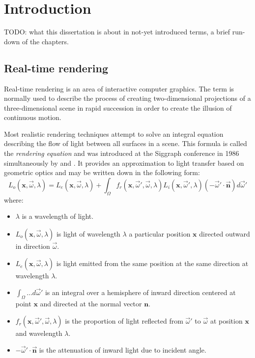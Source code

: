 
\chapter{ Introduction }
\label{Chapter1}

TODO: what this dissertation is about in not-yet introduced terms, a brief run-down of the chapters.

\section{Real-time rendering}

Real-time rendering is an area of interactive computer graphics. The term is normally used to describe the process of creating two-dimensional projections of a three-dimensional scene in rapid succession in order to create the illusion of continuous motion.

Most realistic rendering techniques attempt to solve an integral equation describing the flow of light between all surfaces in a scene. This formula is called the \emph{rendering equation} and was introduced at the Siggraph conference in 1986 simultaneously by \citet{Kajiya86RenderingEq} and \citet{Immel86}. It provides an approximation to light transfer based on geometric optics and may be written down in the following form:
\[
L_o(\mathbf x, \overrightarrow{\omega}, \lambda) = L_e(\mathbf x, \overrightarrow{\omega}, \lambda) + \int_\Omega f_r(\mathbf x, \overrightarrow{\omega}', \overrightarrow{\omega}, \lambda) L_i(\mathbf x, \overrightarrow{\omega}', \lambda) (-\overrightarrow{\omega}' \cdot \overrightarrow{\mathbf n}) d \overrightarrow{\omega}'
\]
where:
\begin{itemize}
\item $\lambda$ is a wavelength of light.
\item $L_o(\mathbf x, \overrightarrow{\omega}, \lambda)$ is light of wavelength $\lambda$ a particular position $\mathbf x$ directed outward in direction $\overrightarrow{\omega}$.
\item $L_e(\mathbf x, \overrightarrow{\omega}, \lambda)$ is light emitted from the same position at the same direction at wavelength $\lambda$.
\item $\int_\Omega \ldots d \overrightarrow{\omega}'$ is an integral over a hemisphere of inward direction centered at point $\mathbf x$ and directed at the normal vector $\mathbf n$.
\item $f_r(\mathbf x, \overrightarrow{\omega}', \overrightarrow{\omega}, \lambda)$ is the proportion of light reflected from $\overrightarrow{\omega}'$ to $\overrightarrow{\omega}$ at position $\mathbf x$ and wavelength $\lambda$.
\item $-\overrightarrow{\omega}' \cdot \overrightarrow{\mathbf n}$ is the attenuation of inward light due to incident angle.
\end{itemize}

